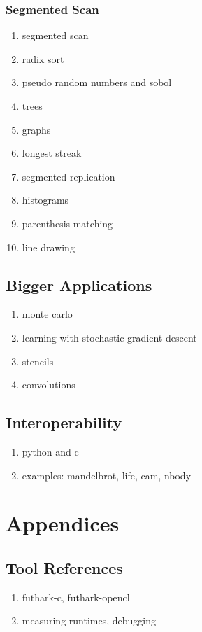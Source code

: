 \documentclass[11pt]{book}
\begin{document}
\section{Segmented Scan}



\begin{enumerate}
\item segmented scan
\item radix sort

\item pseudo random numbers and sobol
\item trees
\item graphs
\item longest streak
\item segmented replication
\item histograms
\item parenthesis matching
\item line drawing
\end{enumerate}

\chapter{Bigger Applications}
\begin{enumerate}
\item monte carlo
\item learning with stochastic gradient descent
\item stencils
\item convolutions
\end{enumerate}

\chapter{Interoperability}
\label{chap:interoperability}

\begin{enumerate}
\item python and c
\item examples: mandelbrot, life, cam, nbody
\end{enumerate}




\appendix

\part{Appendices}

\chapter{Tool References}
\begin{enumerate}
\item futhark-c, futhark-opencl
\item measuring runtimes, debugging
\end{enumerate}
\end{document}
